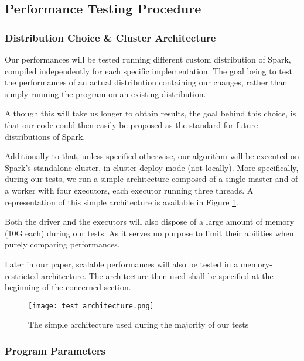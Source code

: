 \documentclass{eplmastersthesis}
\begin{document}
\subsection{Performance Testing Procedure}
\subsubsection{Distribution Choice \& Cluster Architecture}

Our performances will be tested running different custom distribution of Spark, compiled independently for each specific implementation. The goal being to test the performances of an actual distribution containing our changes, rather than simply running the program on an existing distribution. \newline

Although this will take us longer to obtain results, the goal behind this choice, is that our code could then easily be proposed as the standard for future distributions of Spark.  \newline

Additionally to that, unless specified otherwise, our algorithm will be executed on Spark's standalone cluster, in cluster deploy mode (not locally). More specifically, during our tests, we run a simple architecture composed of a single master and of a worker with four executors, each executor running three threads. A representation of this simple architecture is available in Figure \ref{fig:test_architecture}.\newline

Both the driver and the executors will also dispose of a large amount of memory (10G each) during our tests. As it serves no purpose to limit their abilities when purely comparing performances. \newline

Later in our paper, scalable performances will also be tested in a memory-restricted architecture. The architecture then used shall be specified at the beginning of the concerned section.

\begin{figure}[h]
  \centering
  \texttt{[image: test\_architecture.png]}
  \caption{The simple architecture used during the majority of our tests}
  \label{fig:test_architecture}
\end{figure}

\subsubsection{Program Parameters}
\end{document}
